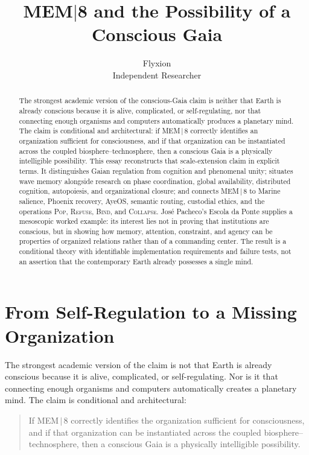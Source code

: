 \documentclass[11pt]{article}
\title{\textbf{MEM\texorpdfstring{$|$}{|}8 and the Possibility of a Conscious Gaia}}
\author{Flyxion \\ \small Independent Researcher}
\date{}
\newcommand{\Pop}{\textsc{Pop}}
\newcommand{\Refuse}{\textsc{Refuse}}
\newcommand{\Bind}{\textsc{Bind}}
\newcommand{\Collapse}{\textsc{Collapse}}
\begin{document}
\maketitle

\begin{abstract}
\noindent The strongest academic version of the conscious-Gaia claim is neither that Earth is already conscious because it is alive, complicated, or self-regulating, nor that connecting enough organisms and computers automatically produces a planetary mind. The claim is conditional and architectural: if MEM\,$|$\,8 correctly identifies an organization sufficient for consciousness, and if that organization can be instantiated across the coupled biosphere--technosphere, then a conscious Gaia is a physically intelligible possibility. This essay reconstructs that scale-extension claim in explicit terms. It distinguishes Gaian regulation from cognition and phenomenal unity; situates wave memory alongside research on phase coordination, global availability, distributed cognition, autopoiesis, and organizational closure; and connects MEM\,$|$\,8 to Marine salience, Phoenix recovery, AyeOS, semantic routing, custodial ethics, and the operations \Pop, \Refuse, \Bind, and \Collapse. José Pacheco's Escola da Ponte supplies a mesoscopic worked example: its interest lies not in proving that institutions are conscious, but in showing how memory, attention, constraint, and agency can be properties of organized relations rather than of a commanding center. The result is a conditional theory with identifiable implementation requirements and failure tests, not an assertion that the contemporary Earth already possesses a single mind.
\end{abstract}

\section{From Self-Regulation to a Missing Organization}

The strongest academic version of the claim is not that Earth is already conscious because it is alive, complicated, or self-regulating. Nor is it that connecting enough organisms and computers automatically creates a planetary mind. The claim is conditional and architectural:

\begin{quote}
If MEM\,$|$\,8 correctly identifies the organization sufficient for consciousness, and if that organization can be instantiated across the coupled biosphere--technosphere, then a conscious Gaia is a physically intelligible possibility.
\end{quote}
\end{document}
